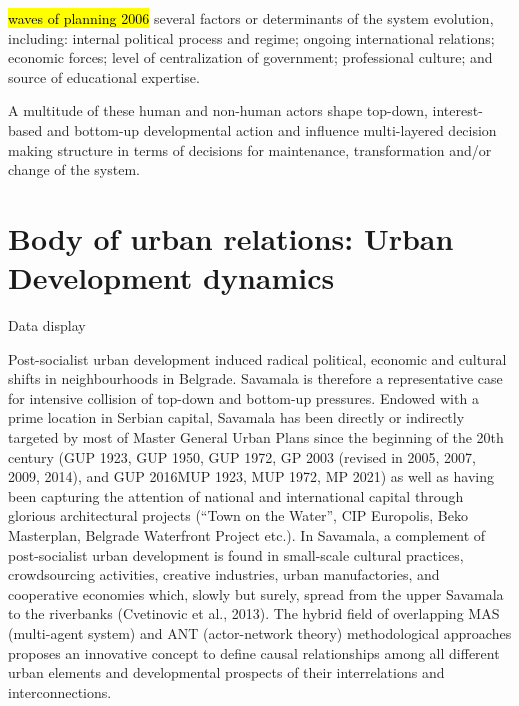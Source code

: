 \documentclass[11pt]{report}
\begin{document}
\hl{waves of planning 2006}
several factors or determinants of the system evolution, including: internal political process and regime; ongoing international relations; economic forces; level of centralization  of  government;  professional  culture;  and  source  of  educational  expertise.

A multitude of  these human and non-human actors shape top-down, interest-based and bottom-up developmental action and influence multi-layered decision making structure in terms of decisions  for maintenance, transformation and/or change of the system. 

\section{Body of urban relations: Urban Development dynamics}
Data display

Post-socialist urban development induced radical political, economic and cultural shifts in neighbourhoods in Belgrade. Savamala is therefore a representative case for intensive collision of top-down and bottom-up pressures. Endowed with a prime location in Serbian capital, Savamala has been directly or indirectly targeted by most of Master General Urban Plans since the beginning of the 20th century (GUP 1923, GUP 1950, GUP 1972, GP 2003 (revised in 2005, 2007, 2009, 2014), and GUP 2016MUP 1923, MUP 1972, MP 2021) as well as having been capturing the attention of national and international capital through glorious architectural projects (“Town on the Water”, CIP Europolis, Beko Masterplan, Belgrade Waterfront Project etc.). In Savamala, a complement of post-socialist urban development is found in small-scale cultural practices, crowdsourcing activities, creative industries, urban manufactories, and cooperative economies which, slowly but surely, spread from the upper Savamala to the riverbanks (Cvetinovic et al., 2013). The hybrid field of overlapping MAS (multi-agent system) and ANT (actor-network theory) methodological approaches proposes an innovative concept to define causal relationships among all different urban elements and developmental prospects of their interrelations and interconnections.
\end{document}
